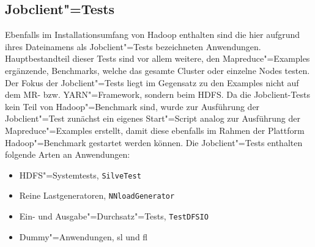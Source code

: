 \subsection{Jobclient"=Tests}
\label{subsec:jobclient}

Ebenfalls im Installationsumfang von Hadoop enthalten sind die hier aufgrund ihres Dateinamens als Jobclient"=Tests bezeichneten Anwendungen.
Hauptbestandteil dieser Tests sind vor allem weitere, den Mapreduce"=Examples ergänzende, Benchmarks, welche das gesamte Cluster oder einzelne Nodes testen.
Der Fokus der Jobclient"=Tests liegt im Gegensatz zu den Examples nicht auf dem \gls{MR}- bzw. YARN"=Framework, sondern beim HDFS.
Da die Jobclient-Tests kein Teil von Hadoop"=Benchmark sind, wurde zur Ausführung der Jobclient"=Test zunächst ein eigenes Start"=Script analog zur Ausführung der Mapreduce"=Examples erstellt, damit diese ebenfalls im Rahmen der Plattform Hadoop"=Benchmark gestartet werden können.
Die Jobclient"=Tests enthalten \uA folgende Arten an Anwendungen:

\begin{itemize}
    \item HDFS"=Systemtests, \zB \texttt{SilveTest}
    \item Reine Lastgeneratoren, \zB \texttt{NNloadGenerator}
    \item Ein- und Ausgabe"=Durchsatz"=Tests, \zB \texttt{TestDFSIO}
    \item Dummy"=Anwendungen, \zB \acrlong{sl} und \acrlong{fl}
\end{itemize}
